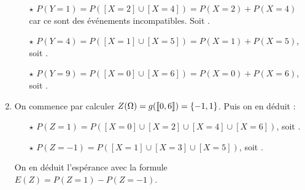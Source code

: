 \documentclass[a4paper, 11pt,reqno]{article}
\begin{document}
\begin{correction}
\begin{enumerate}
\begin{itemize}
			      \item[$\star$] $P(Y=1) = P([X=2]\cup[X=4]) = P(X=2) + P(X=4)$ car ce sont des \'ev\'enements incompatibles. Soit  .
			      \item[$\star$]  $P(Y=4) = P([X=1]\cup[X=5]) = P(X=1) + P(X=5)$, soit  .
			      \item[$\star$]  $P(Y=9) = P([X=0]\cup[X=6]) = P(X=0) + P(X=6)$, soit  .
		      \end{itemize}
		\item On commence par calculer $Z(\Omega) = g(\llbracket 0,6\rrbracket) = \{-1,1\}$. Puis on en d\'eduit :
		      \begin{itemize}
			      \item[$\star$] $P(Z=1) = P([X=0]\cup[X=2]\cup[X=4]\cup[X=6])$, soit .
			      \item[$\star$] $P(Z=-1) = P([X=1]\cup[X=3]\cup[X=5])$, soit .\end{itemize}
		      On en d\'eduit l'esp\'erance avec la formule $E(Z) = P(Z=1) - P(Z=-1)$.
	\end{enumerate}
\end{correction}
\end{document}
